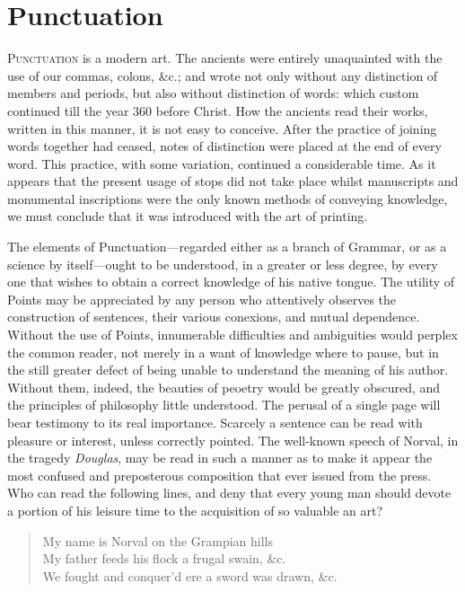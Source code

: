 \chapter{Punctuation}
\textsc{Punctuation} is a modern art. The ancients were entirely unaquainted
with the use of our commas, colons, \&c.; and wrote not only without any
distinction of members and periods, but also without distinction of words: which
custom continued till the year 360 before Christ. How the ancients read their
works, written in this manner, it is not easy to conceive. After the practice of
joining words together had ceased, notes of distinction were placed at the end
of every word. This practice, with some variation, continued a considerable
time. As it appears that the present usage of stops did not take place whilst
manuscripts and monumental inscriptions were the only known methods of conveying
knowledge, we must conclude that it was introduced with the art of printing.

The elements of Punctuation---regarded either as a branch of Grammar, or as a
science by itself---ought to be understood, in a greater or less degree, by
every one that wishes to obtain a correct knowledge of his native tongue. The
utility of Points may be appreciated by any person who attentively observes the
construction of sentences, their various conexions, and mutual dependence.
Without the use of Points, innumerable difficulties and ambiguities would
perplex the common reader, not merely in a want of knowledge where to pause, but
in the still greater defect of being unable to understand the meaning of his
author. Without them, indeed, the beauties of peoetry would be greatly obscured,
and the principles of philosophy little understood. The perusal of a single page
will bear testimony to its real importance. Scarcely a sentence can be read with
pleasure or interest, unless correctly pointed. The well-known speech of Norval,
in the tragedy \emph{Douglas}, may be read in such a manner as to make it appear
the most confused and preposterous composition that ever issued from the press.
Who can read the following lines, and deny that every young man should devote a
portion of his leisure time to the acquisition of so valuable an art?

\begin{quote}
My name is Norval on the Grampian hills\\
My father feeds his flock a frugal swain, \&c.\\
We fought and conquer'd ere a sword was drawn, \&c.
\end{quote}

